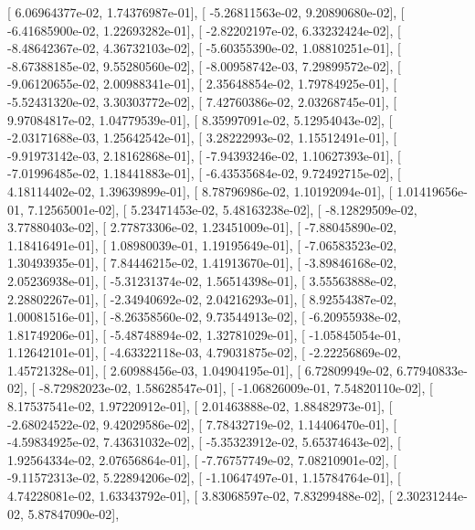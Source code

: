 \documentclass{article}
\begin{document}
       [  6.06964377e-02,   1.74376987e-01],
       [ -5.26811563e-02,   9.20890680e-02],
       [ -6.41685900e-02,   1.22693282e-01],
       [ -2.82202197e-02,   6.33232424e-02],
       [ -8.48642367e-02,   4.36732103e-02],
       [ -5.60355390e-02,   1.08810251e-01],
       [ -8.67388185e-02,   9.55280560e-02],
       [ -8.00958742e-03,   7.29899572e-02],
       [ -9.06120655e-02,   2.00988341e-01],
       [  2.35648854e-02,   1.79784925e-01],
       [ -5.52431320e-02,   3.30303772e-02],
       [  7.42760386e-02,   2.03268745e-01],
       [  9.97084817e-02,   1.04779539e-01],
       [  8.35997091e-02,   5.12954043e-02],
       [ -2.03171688e-03,   1.25642542e-01],
       [  3.28222993e-02,   1.15512491e-01],
       [ -9.91973142e-03,   2.18162868e-01],
       [ -7.94393246e-02,   1.10627393e-01],
       [ -7.01996485e-02,   1.18441883e-01],
       [ -6.43535684e-02,   9.72492715e-02],
       [  4.18114402e-02,   1.39639899e-01],
       [  8.78796986e-02,   1.10192094e-01],
       [  1.01419656e-01,   7.12565001e-02],
       [  5.23471453e-02,   5.48163238e-02],
       [ -8.12829509e-02,   3.77880403e-02],
       [  2.77873306e-02,   1.23451009e-01],
       [ -7.88045890e-02,   1.18416491e-01],
       [  1.08980039e-01,   1.19195649e-01],
       [ -7.06583523e-02,   1.30493935e-01],
       [  7.84446215e-02,   1.41913670e-01],
       [ -3.89846168e-02,   2.05236938e-01],
       [ -5.31231374e-02,   1.56514398e-01],
       [  3.55563888e-02,   2.28802267e-01],
       [ -2.34940692e-02,   2.04216293e-01],
       [  8.92554387e-02,   1.00081516e-01],
       [ -8.26358560e-02,   9.73544913e-02],
       [ -6.20955938e-02,   1.81749206e-01],
       [ -5.48748894e-02,   1.32781029e-01],
       [ -1.05845054e-01,   1.12642101e-01],
       [ -4.63322118e-03,   4.79031875e-02],
       [ -2.22256869e-02,   1.45721328e-01],
       [  2.60988456e-03,   1.04904195e-01],
       [  6.72809949e-02,   6.77940833e-02],
       [ -8.72982023e-02,   1.58628547e-01],
       [ -1.06826009e-01,   7.54820110e-02],
       [  8.17537541e-02,   1.97220912e-01],
       [  2.01463888e-02,   1.88482973e-01],
       [ -2.68024522e-02,   9.42029586e-02],
       [  7.78432719e-02,   1.14406470e-01],
       [ -4.59834925e-02,   7.43631032e-02],
       [ -5.35323912e-02,   5.65374643e-02],
       [  1.92564334e-02,   2.07656864e-01],
       [ -7.76757749e-02,   7.08210901e-02],
       [ -9.11572313e-02,   5.22894206e-02],
       [ -1.10647497e-01,   1.15784764e-01],
       [  4.74228081e-02,   1.63343792e-01],
       [  3.83068597e-02,   7.83299488e-02],
       [  2.30231244e-02,   5.87847090e-02],
\end{document}
